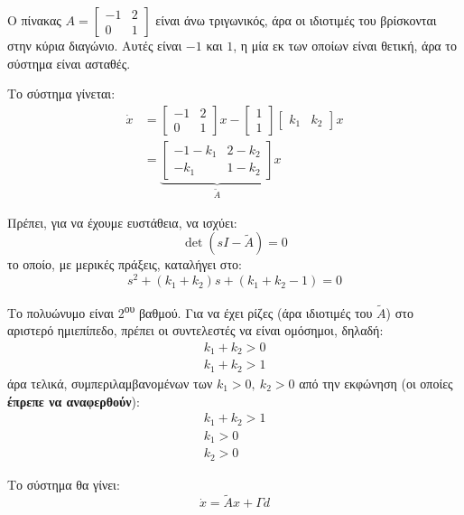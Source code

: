 \documentclass[11pt,a4paper,notitlepage,fleqn]{article}
\begin{document}
\begin{exercise}
	\tcblower
	\begin{enumgreekparen}
		\item Ο πίνακας \( A = \left[\begin{matrix}
		-1 & 2 \\ 0 & 1
		\end{matrix}\right] \) είναι άνω τριγωνικός, άρα οι ιδιοτιμές
		του βρίσκονται στην κύρια διαγώνιο. Αυτές είναι \( -1 \) και
		\( 1 \), η μία εκ των οποίων είναι θετική, άρα το σύστημα είναι
		ασταθές.
		\item 
		Το σύστημα γίνεται:
		\begin{align*}
			\dot x &= \left[\begin{matrix}
			-1 & 2 \\ 0 & 1
			\end{matrix}\right]x - \left[\begin{matrix}
			1 \\ 1
			\end{matrix}\right]\left[\begin{matrix}
			k_1 & k_2
			\end{matrix}\right]x
			\\ &= \underbrace{\left[\begin{matrix}
			-1-k_1 & 2-k_2 \\
			-k_1 & 1-k_2
			\end{matrix}\right]}_{\tilde A}x
		\end{align*}
		
		Πρέπει, για να έχουμε ευστάθεια, να ισχύει:
		\[
		\det(sI-\tilde A) = 0
		\]
		το οποίο, με μερικές πράξεις, καταλήγει στο:
		\[
		s^2 + (k_1+k_2)s + (k_1+k_2 -1) = 0
		\]
		
		Το πολυώνυμο είναι 2\textsuperscript{ου} βαθμού. Για να έχει
		ρίζες (άρα ιδιοτιμές του \( \tilde A \)) στο αριστερό ημιεπίπεδο,
		πρέπει οι συντελεστές να είναι ομόσημοι, δηλαδή:
		\begin{gather*}
			k_1 + k_2 > 0\\
			k_1+k_2 > 1
		\end{gather*}
		άρα τελικά, συμπεριλαμβανομένων των \( k_1>0,\ k_2>0 \) από
		την εκφώνηση (οι οποίες \textbf{έπρεπε να αναφερθούν}):
		\begin{gather*}
			k_1+k_2 > 1\\
			k_1 > 0\\
			k_2 > 0
		\end{gather*}
        \item Το σύστημα θα γίνει:
        \[
        \dot x = \tilde A x + Γd
        \]
        

\end{enumgreekparen}
\end{exercise}
\end{document}
